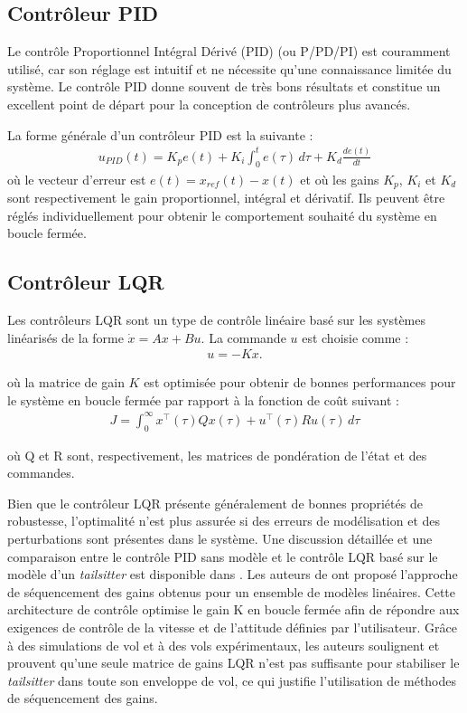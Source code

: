 \subsection*{Contrôleur PID}
Le contrôle Proportionnel Intégral Dérivé (PID) (ou P/PD/PI) est couramment utilisé, car son réglage est intuitif et ne nécessite qu'une connaissance limitée du système. Le contrôle PID donne souvent de très bons résultats et constitue un excellent point de départ pour la conception de contrôleurs plus avancés.

La forme générale d'un contrôleur PID est la suivante :
\begin{align}
    u_{PID}(t) = K_{p} e(t) + K_{i} \int_{0}^{t} e(\tau) \,d\tau + K_{d} \frac{d e(t)}{dt}
\end{align}
où le vecteur d'erreur est $e(t) = x_{ref} (t) - x(t)$ et où les gains $K_{p}$, $K_{i}$ et $K_{d}$ sont respectivement le gain proportionnel, intégral et dérivatif. Ils peuvent être réglés individuellement pour obtenir le comportement souhaité du système en boucle fermée.

\subsection*{Contrôleur LQR}
Les contrôleurs LQR sont un type de contrôle linéaire basé sur les systèmes linéarisés de la forme $\dot{x} = Ax+Bu$. La commande $u$ est
choisie comme :
\begin{align*}
    u = -Kx.
\end{align*}

où la matrice de gain $K$ est optimisée pour obtenir de bonnes performances pour le système en boucle fermée par rapport à la fonction de coût suivant :
\begin{align*}
    J = \int_{0}^{\infty} x^{\top}(\tau)Q x(\tau) + u^{\top}(\tau)R u(\tau) \,d\tau
\end{align*}

où Q et R sont, respectivement, les matrices de pondération de l'état et des commandes. 

Bien que le contrôleur LQR présente généralement de bonnes propriétés de robustesse, l'optimalité n'est plus assurée si des erreurs de modélisation et des perturbations sont présentes dans le système. Une discussion détaillée et une comparaison entre le contrôle PID sans modèle et le contrôle LQR basé sur le modèle d'un \textit{tailsitter} est disponible dans \cite{BarthCondomines2018}.
Les auteurs de \cite{Lustosa2017LaP} ont proposé l'approche de séquencement des gains obtenus pour un ensemble de modèles linéaires. Cette architecture de contrôle optimise le gain K en boucle fermée afin de répondre aux exigences de contrôle de la vitesse et de l'attitude définies par l'utilisateur. Grâce à des simulations de vol et à des vols expérimentaux, les auteurs soulignent et prouvent qu'une seule matrice de gains LQR n'est pas suffisante pour stabiliser le \textit{tailsitter} dans toute son enveloppe de vol, ce qui justifie l'utilisation de méthodes de séquencement des gains.

